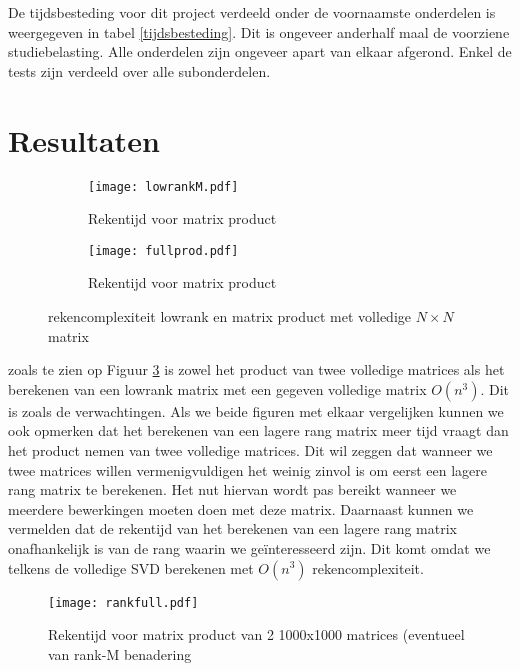 \documentclass[a4paper]{article}
\begin{document}
De tijdsbesteding voor dit project verdeeld onder de voornaamste onderdelen is weergegeven in tabel \ref{tijdsbesteding}. Dit is ongeveer anderhalf maal de voorziene studiebelasting. Alle onderdelen zijn ongeveer apart van elkaar afgerond. Enkel de tests zijn verdeeld over alle subonderdelen.


\section*{Resultaten}

\begin{figure}
\centering
\begin{subfigure}{.48\textwidth}
	\centering
	\texttt{[image: lowrankM.pdf]}
	\caption{Rekentijd voor matrix product}
	\label{lowrank}
\end{subfigure}
\begin{subfigure}{.48\textwidth}
	\centering
	\texttt{[image: fullprod.pdf]}
	\caption{Rekentijd voor matrix product}
	\label{fullprod}
\end{subfigure}
\caption{rekencomplexiteit lowrank en matrix product met volledige $N \times N$ matrix}
\label{o3complex}
\end{figure}

zoals te zien op Figuur \ref{o3complex} is zowel het product van twee volledige matrices als het berekenen van een lowrank matrix met een gegeven volledige matrix \(O(n^3)\). Dit is zoals de verwachtingen. Als we beide figuren met elkaar vergelijken kunnen we ook opmerken dat het berekenen van een lagere rang matrix meer tijd vraagt dan het product nemen van twee volledige matrices. Dit wil zeggen dat wanneer we twee matrices willen vermenigvuldigen het weinig zinvol is om eerst een lagere rang matrix te berekenen. Het nut hiervan wordt pas bereikt wanneer we meerdere bewerkingen moeten doen met deze matrix. Daarnaast kunnen we vermelden dat de rekentijd van het berekenen van een lagere rang matrix onafhankelijk is van de rang waarin we ge\"interesseerd zijn. Dit komt omdat we telkens de volledige SVD berekenen met \(O(n^3)\) rekencomplexiteit.

\begin{figure}
\centering
	\texttt{[image: rankfull.pdf]}
	\caption{Rekentijd voor matrix product van 2 1000x1000 matrices (eventueel van rank-M benadering}
	\label{rankfullplot}
\end{figure}
\end{document}
